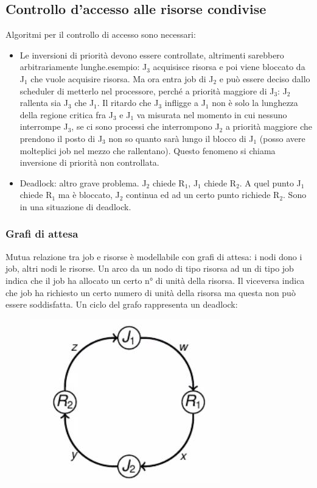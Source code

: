 \documentclass[12pt, oneside]{extbook}
\begin{document}
\subsection{Controllo d'accesso alle risorse condivise}
Algoritmi per il controllo di accesso sono necessari:
\begin{itemize}
\item Le inversioni di priorità devono essere controllate, altrimenti sarebbero arbitrariamente lunghe.esempio: J$_{3}$ acquisisce risorsa e poi viene bloccato da J$_{1}$ che vuole acquisire risorsa. Ma ora entra job di J$_{2}$ e può essere deciso dallo scheduler di metterlo nel processore, perché a priorità maggiore di J$_{3}$: J$_{2}$ rallenta sia J$_{3}$ che J$_{1}$. Il ritardo che J$_{3}$ infligge a J$_{1}$ non è solo la lunghezza della regione critica fra J$_{3}$ e J$_{1}$ va misurata nel momento in cui nessuno interrompe J$_{3}$, se ci sono processi che interrompono J$_{2}$ a priorità maggiore che prendono il posto di J$_{3}$ non so quanto sarà lungo il blocco di J$_{1}$ (posso avere molteplici job nel mezzo che rallentano). Questo fenomeno si chiama inversione di priorità non controllata.
\item Deadlock: altro grave problema. J$_{2}$ chiede R$_{1}$, J$_{1}$ chiede R$_{2}$. A quel punto J$_{1}$ chiede R$_{1}$ ma è bloccato, J$_{2}$ continua ed ad un certo punto richiede R$_{2}$. Sono in una situazione di deadlock.
\end{itemize}
\subsubsection{Grafi di attesa}
Mutua relazione tra job e risorse è modellabile con grafi di attesa: i nodi dono i job, altri nodi le risorse. Un arco da un nodo di tipo risorsa ad un di tipo job indica che il job ha allocato un certo n° di unità della risorsa. Il viceversa indica che job ha richiesto un certo numero di unità della risorsa ma questa non può essere soddisfatta. Un ciclo del grafo rappresenta un deadlock:\\
\begin{figure}[!h]
\centering
\includegraphics[scale=0.4]{immagini/image-021.jpg}
\end{figure}
\end{document}

